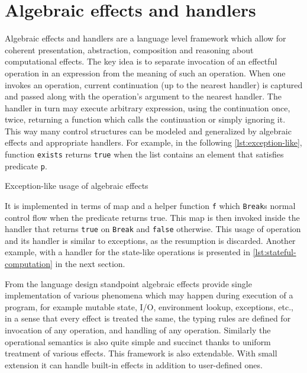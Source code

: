 \documentclass[inz, english, shortabstract]{iithesis}
\begin{document}
\section{Algebraic effects and handlers}
Algebraic effects and handlers are a language level framework which allow for coherent presentation, abstraction, composition and reasoning about computational effects.
The key idea is to separate invocation of an effectful operation in an expression from the meaning of such an operation.
When one invokes an operation, current continuation (up to the nearest handler) is captured and passed along with the operation's argument to the nearest handler.
The handler in turn may execute arbitrary expression, using the continuation once, twice, returning a function which calls the continuation or simply ignoring it.
This way many control structures can be modeled and generalized by algebraic effects and appropriate handlers.
For example, in the following \autoref{lst:exception-like}, function \texttt{exists} returns \texttt{true} when the list contains an element that satisfies predicate \texttt{p}.
\begin{listing}[H]
  \caption{Exception-like usage of algebraic effects}
  \label{lst:exception-like}
\end{listing}
It is implemented in terms of map and a helper function \texttt{f} which \texttt{Break}s normal control flow when the predicate returns true.
This map is then invoked inside the handler that returns \texttt{true} on \texttt{Break} and \texttt{false} otherwise.
This usage of operation and its handler is similar to exceptions, as the resumption is discarded.
Another example, with a handler for the state-like operations is presented in \autoref{lst:stateful-computation} in the next section.

From the language design standpoint algebraic effects provide single implementation of various phenomena which may happen during execution of a program, for example mutable state, I/O, environment lookup, exceptions, etc., in a sense that every effect is treated the same, the typing rules are defined for invocation of any operation, and handling of any operation.
Similarly the operational semantics is also quite simple and succinct thanks to uniform treatment of various effects.
This framework is also extendable.
With small extension it can handle built-in effects in addition to user-defined ones.
\end{document}
